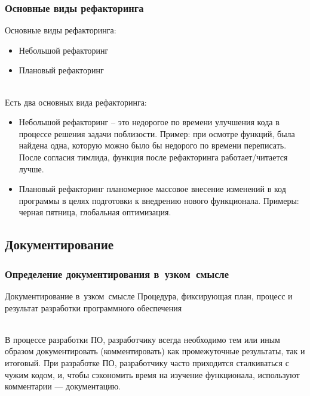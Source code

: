 \documentclass[lecturenotes]{../industrial-development}
\begin{document}
\begin{frame} \frametitle{Основные виды рефакторинга}
	Основные виды рефакторинга:
	\begin{itemize}
		\item Небольшой рефакторинг 
		\item Плановый рефакторинг
	\end{itemize}
\end{frame}
\lecturenotes
\\Есть два основных вида рефакторинга:\\
\begin{itemize}
\item Небольшой рефакторинг – это недорогое по времени улучшения кода в процессе решения задачи поблизости. Пример: при осмотре функций, была найдена одна, которую можно было бы недорого по времени переписать. После согласия тимлида, функция после рефакторинга работает/читается лучше.
\item Плановый рефакторинг планомерное массовое внесение изменений в код программы в целях подготовки к внедрению нового функционала. Примеры: черная пятница, глобальная оптимизация.
\end{itemize}


\subsection{Документирование}
\begin{frame} \frametitle{Определение документирования в~узком~смысле}
	\begin{block}{Документирование в~узком~смысле}
		Процедура, фиксирующая план, процесс и результат разработки программного обеспечения
	\end{block}
\end{frame}
\lecturenotes
\\В процессе разработки ПО, разработчику всегда необходимо тем или иным образом документировать (комментировать) как промежуточные результаты, так и итоговый. При разработке ПО, разработчику часто приходится сталкиваться с чужим кодом, и, чтобы сэкономить время на изучение функционала, используют комментарии --- документацию.
\end{document}
